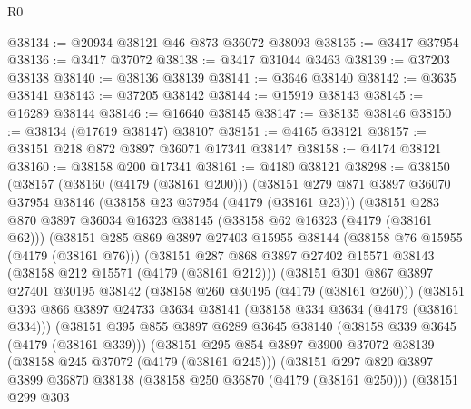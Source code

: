 \begin{lexlean}{R0}
\begin{coremodule}
@38134 := @20934 @38121 @46 @873 @36072 @38093
@38135 := @3417 @37954
@38136 := @3417 @37072
@38138 := @3417 @31044 @3463
@38139 := @37203 @38138
@38140 := @38136 @38139
@38141 := @3646 @38140
@38142 := @3635 @38141
@38143 := @37205 @38142
@38144 := @15919 @38143
@38145 := @16289 @38144
@38146 := @16640 @38145
@38147 := @38135 @38146
@38150 := @38134 (@17619 @38147) @38107
@38151 := @4165 @38121
@38157 := @38151 @218 @872 @3897 @36071 @17341 @38147
@38158 := @4174 @38121
@38160 := @38158 @200 @17341
@38161 := @4180 @38121
@38298 := @38150
    (@38157
      (@38160 (@4179 (@38161 @200)))
      (@38151
        @279
        @871
        @3897
        @36070
        @37954
        @38146
        (@38158 @23 @37954 (@4179 (@38161 @23)))
        (@38151
          @283
          @870
          @3897
          @36034
          @16323
          @38145
          (@38158 @62 @16323 (@4179 (@38161 @62)))
          (@38151
            @285
            @869
            @3897
            @27403
            @15955
            @38144
            (@38158 @76 @15955 (@4179 (@38161 @76)))
            (@38151
              @287
              @868
              @3897
              @27402
              @15571
              @38143
              (@38158 @212 @15571 (@4179 (@38161 @212)))
              (@38151
                @301
                @867
                @3897
                @27401
                @30195
                @38142
                (@38158 @260 @30195 (@4179 (@38161 @260)))
                (@38151
                  @393
                  @866
                  @3897
                  @24733
                  @3634
                  @38141
                  (@38158 @334 @3634 (@4179 (@38161 @334)))
                  (@38151
                    @395
                    @855
                    @3897
                    @6289
                    @3645
                    @38140
                    (@38158 @339 @3645 (@4179 (@38161 @339)))
                    (@38151
                      @295
                      @854
                      @3897
                      @3900
                      @37072
                      @38139
                      (@38158 @245 @37072 (@4179 (@38161 @245)))
                      (@38151
                        @297
                        @820
                        @3897
                        @3899
                        @36870
                        @38138
                        (@38158 @250 @36870 (@4179 (@38161 @250)))
                        (@38151
                          @299
                          @303

\end{coremodule}
\end{lexlean}

